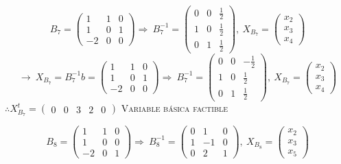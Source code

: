 \begin{itemize}
    $$B_7=\begin{pmatrix}1&1&0\\ 1&0&1\\ -2&0&0\end{pmatrix}\Rightarrow \:B_7^{-1}=\begin{pmatrix}0&0&\frac{1}{2}\\ 1&0&\frac{1}{2}\\ 0&1&\frac{1}{2}\end{pmatrix},\:X_{B_7}=\begin{pmatrix}x_2\\ x_3\\ x_4\end{pmatrix}$$
    $$\rightarrow \:X_{B_7}=B_7^{-1}b=\begin{pmatrix}1&1&0\\ 1&0&1\\ -2&0&0\end{pmatrix}\Rightarrow \:B_7^{-1}=\begin{pmatrix}0&0&-\frac{1}{2}\\ 1&0&\frac{1}{2}\\ 0&1&\frac{1}{2}\end{pmatrix},\:X_{B_7}=\begin{pmatrix}x_2\\ x_3\\ x_4\end{pmatrix}$$
    $\therefore X_{B_7}^t=\begin{pmatrix}0&0&3&2&0\end{pmatrix}$ \textsc{Variable  básica factible}
    
    $$B_8=\begin{pmatrix}1&1&0\\ 1&0&0\\ -2&0&1\end{pmatrix}\Rightarrow \:B_8^{-1}=\begin{pmatrix}0&1&0\\ 1&-1&0\\ 0&2&1\end{pmatrix},\:X_{B_8}=\begin{pmatrix}x_2\\ x_3\\ x_5\end{pmatrix}$$
    

\end{itemize}
